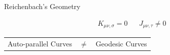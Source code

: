 \documentclass[submitted]{article}
\begin{document}
\begin{infobox}

\begin{center}
Reichenbach's Geometry	
\end{center}

\begin{align*}
K_{\mu \nu, \sigma} = 0 & & J_{\mu\nu,\tau}\neq 0
\end{align*}


\begin{center}
\begin{tabular}{ccc}
 Auto-parallel Curves & $\neq$ & Geodesic Curves
\end{tabular}
\end{center}
	
\end{infobox}



\printshorthands
\printbibliography
\end{document}
